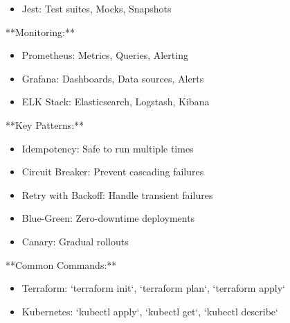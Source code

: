 \documentclass[11pt,a4paper]{article}
\begin{document}
\begin{itemize}
\item Jest: Test suites, Mocks, Snapshots
\end{itemize}

**Monitoring:**

\begin{itemize}
\item Prometheus: Metrics, Queries, Alerting
\end{itemize}

\begin{itemize}
\item Grafana: Dashboards, Data sources, Alerts
\end{itemize}

\begin{itemize}
\item ELK Stack: Elasticsearch, Logstash, Kibana
\end{itemize}

**Key Patterns:**

\begin{itemize}
\item Idempotency: Safe to run multiple times
\end{itemize}

\begin{itemize}
\item Circuit Breaker: Prevent cascading failures
\end{itemize}

\begin{itemize}
\item Retry with Backoff: Handle transient failures
\end{itemize}

\begin{itemize}
\item Blue-Green: Zero-downtime deployments
\end{itemize}

\begin{itemize}
\item Canary: Gradual rollouts
\end{itemize}

**Common Commands:**

\begin{itemize}
\item Terraform: `terraform init`, `terraform plan`, `terraform apply`
\end{itemize}

\begin{itemize}
\item Kubernetes: `kubectl apply`, `kubectl get`, `kubectl describe`
\end{itemize}
\end{document}
